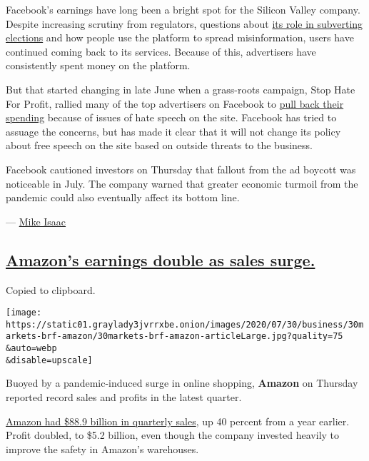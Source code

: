 Facebook's earnings have long been a bright spot for the Silicon Valley
company. Despite increasing scrutiny from regulators, questions about
\href{https://www.nytimes3xbfgragh.onion/2018/02/17/technology/indictment-russian-tech-facebook.html}{its
role in subverting elections} and how people use the platform to spread
misinformation, users have continued coming back to its services.
Because of this, advertisers have consistently spent money on the
platform.

But that started changing in late June when a grass-roots campaign, Stop
Hate For Profit, rallied many of the top advertisers on Facebook to
\href{https://www.nytimes3xbfgragh.onion/2020/06/30/technology/facebook-advertising-boycott.html}{pull
back their spending} because of issues of hate speech on the site.
Facebook has tried to assuage the concerns, but has made it clear that
it will not change its policy about free speech on the site based on
outside threats to the business.

Facebook cautioned investors on Thursday that fallout from the ad
boycott was noticeable in July. The company warned that greater economic
turmoil from the pandemic could also eventually affect its bottom line.

--- \href{https://www.nytimes3xbfgragh.onion/by/mike-isaac}{Mike Isaac}

\hypertarget{amazons-earnings-double-as-sales-surge}{%
\subsection{\texorpdfstring{\protect\hyperlink{amazons-earnings-double-as-sales-surge}{Amazon's
earnings double as sales
surge.}}{Amazon's earnings double as sales surge.}}\label{amazons-earnings-double-as-sales-surge}}

Copied to clipboard.

\texttt{[image: https://static01.graylady3jvrrxbe.onion/images/2020/07/30/business/30markets-brf-amazon/30markets-brf-amazon-articleLarge.jpg?quality=75\\\&auto=webp\\\&disable=upscale]}

Buoyed by a pandemic-induced surge in online shopping, \textbf{Amazon}
on Thursday reported record sales and profits in the latest quarter.

\href{https://www.nytimes3xbfgragh.onion/2020/05/22/technology/amazon-coronavirus-target-walmart.html}{Amazon
had \$88.9 billion in quarterly sales}, up 40 percent from a year
earlier. Profit doubled, to \$5.2 billion, even though the company
invested heavily to improve the safety in Amazon's warehouses.

